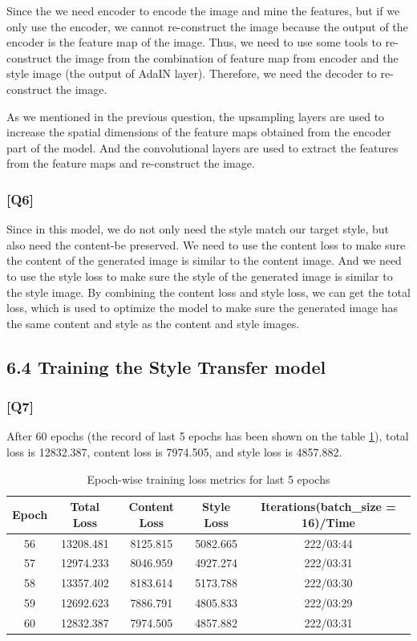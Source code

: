 \documentclass{article}
\begin{document}
Since the we need encoder to encode the image and mine the features, but if we only use the encoder, we cannot re-construct the image because the output of the encoder is the feature map of the image.
Thus, we need to use some tools to re-construct the image from the combination of feature map from encoder and the style image (the output of AdaIN layer).
Therefore, we need the decoder to re-construct the image.

As we mentioned in the previous question, the upsampling layers are used to increase the spatial dimensions of the feature maps obtained from the encoder part of the model.
And the convolutional layers are used to extract the features from the feature maps and re-construct the image.


\subsubsection*{[Q6]}
Since in this model, we do not only need the style match our target style, but also need the content-be preserved.
We need to use the content loss to make sure the content of the generated image is similar to the content image.
And we need to use the style loss to make sure the style of the generated image is similar to the style image.
By combining the content loss and style loss, we can get the total loss, which is used to optimize the model to make sure the generated image has the same content and style as the content and style images.

\subsection*{6.4 Training the Style Transfer model}

\subsubsection*{[Q7]}

After 60 epochs (the record of last 5 epochs has been shown on the table \ref{tab:training_loss}), total loss is 12832.387, content loss is 7974.505, and style loss is 4857.882.

\begin{table}[h]
    \centering
    \begin{tabular}{|c|c|c|c|c|}
    \hline
    \textbf{Epoch} & \textbf{Total Loss} & \textbf{Content Loss} & \textbf{Style Loss} & \textbf{Iterations(batch\_size = 16)/Time} \\ \hline
    56 & 13208.481 & 8125.815 & 5082.665 & 222/03:44 \\ \hline
    57 & 12974.233 & 8046.959 & 4927.274 & 222/03:31 \\ \hline
    58 & 13357.402 & 8183.614 & 5173.788 & 222/03:30 \\ \hline
    59 & 12692.623 & 7886.791 & 4805.833 & 222/03:29 \\ \hline
    60 & 12832.387 & 7974.505 & 4857.882 & 222/03:31 \\ \hline
    \end{tabular}
    \caption{Epoch-wise training loss metrics for last 5 epochs}
    \label{tab:training_loss}
\end{table}
    
\end{document}
